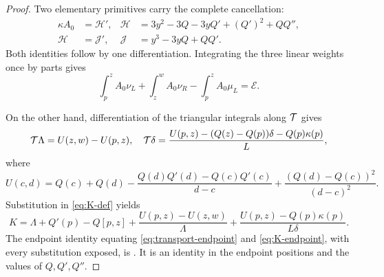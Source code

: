 \begin{proof}
Two elementary primitives carry the complete cancellation:
\begin{align}
 \kappa A_0&=\mathcal H',&
 \mathcal H&=3y^2-3Q-3yQ'+(Q')^2+QQ'',\label{eq:H}\\
 \mathcal H&=\mathcal J',& \mathcal J&=y^3-3yQ+QQ'.\label{eq:J}
\end{align}
Both identities follow by one differentiation. Integrating the three linear
weights once by parts gives
\begin{equation}\label{eq:expectation-endpoint}
 \int_p^z A_0\nu_L+\int_z^w A_0\nu_R-\int_p^z A_0\mu_L
 =\mathcal E.
\end{equation}

On the other hand, differentiation of the triangular integrals along \(\mathcal{T}\)
gives
\[
 \mathcal{T}\Lambda=U(z,w)-U(p,z),
\quad
 \mathcal{T}\delta=\frac{U(p,z)-(Q(z)-Q(p))\delta-Q(p)\kappa(p)}L,
\]
where
\begin{equation}\label{eq:U-endpoint}
 U(c,d)=Q(c)+Q(d)-\frac{Q(d)Q'(d)-Q(c)Q'(c)}{d-c}
 +\frac{(Q(d)-Q(c))^2}{(d-c)^2}.
\end{equation}
Substitution in \eqref{eq:K-def} yields
\begin{equation}\label{eq:K-endpoint}
 K=\Lambda+Q'(p)-Q[p,z]
 +\frac{U(p,z)-U(z,w)}{\Lambda}
 +\frac{U(p,z)-Q(p)\kappa(p)}{L\delta}.
\end{equation}
The endpoint identity equating \eqref{eq:transport-endpoint} and
\eqref{eq:K-endpoint}, with every substitution exposed, is
. It is an identity in the endpoint positions and the
values of \(Q,Q',Q''\).
\end{proof}
